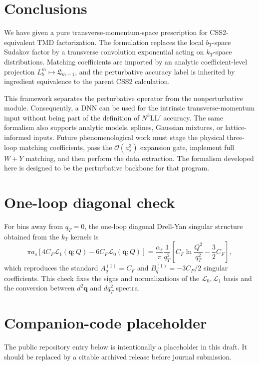 \documentclass[aps,prd,preprint,superscriptaddress,nofootinbib,longbibliography]{revtex4-2}
\newcommand{\bq}{\bm q}
\newcommand{\order}[1]{\mathcal O\!\left(#1\right)}
\begin{document}
\section{Conclusions}

We have given a pure transverse-momentum-space prescription for CSS2-equivalent TMD factorization.  The formulation replaces the local $b_T$-space Sudakov factor by a transverse convolution exponential acting on $k_T$-space distributions.  Matching coefficients are imported by an analytic coefficient-level projection $L_b^m\mapsto\mathfrak L_{m-1}$, and the perturbative accuracy label is inherited by ingredient equivalence to the parent CSS2 calculation.

This framework separates the perturbative operator from the nonperturbative module.  Consequently, a DNN can be used for the intrinsic transverse-momentum input without being part of the definition of $N^3\mathrm{LL}'$ accuracy.  The same formalism also supports analytic models, splines, Gaussian mixtures, or lattice-informed inputs.  Future phenomenological work must stage the physical three-loop matching coefficients, pass the $\order{a_s^3}$ expansion gate, implement full $W+Y$ matching, and then perform the data extraction.  The formalism developed here is designed to be the perturbative backbone for that program.

\appendix

\section{One-loop diagonal check}

For bins away from $q_T=0$, the one-loop diagonal Drell-Yan singular structure obtained from the $k_T$ kernels is
\begin{equation}
  \pi a_s\left[4C_F\mathcal L_1(\bq;Q)-6C_F\mathcal L_0(\bq;Q)\right]
  =\frac{\alpha_s}{\pi}\frac{1}{q_T^2}
  \left[C_F\ln\frac{Q^2}{q_T^2}-\frac32C_F\right],
\end{equation}
which reproduces the standard $A_q^{(1)}=C_F$ and $B_q^{(1)}=-3C_F/2$ singular coefficients.  This check fixes the signs and normalizations of the $\mathcal L_0,\mathcal L_1$ basis and the conversion between $d^2\bq$ and $dq_T^2$ spectra.

\section{Companion-code placeholder}

The public repository entry below is intentionally a placeholder in this draft.  It should be replaced by a citable archived release before journal submission.
\end{document}
